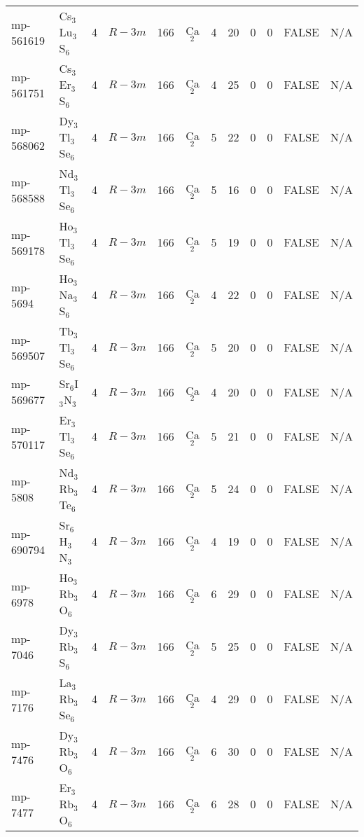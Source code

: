 {\begin{longtable}{llcccccccccc}
    mp-561619 & Cs$_{3}$Lu$_{3}$S$_{6}$ & 4     & $R-3m$ & 166   & Ca$_{2}$ & 4     & 20    & 0     & 0     & FALSE & N/A \\
    mp-561751 & Cs$_{3}$Er$_{3}$S$_{6}$ & 4     & $R-3m$ & 166   & Ca$_{2}$ & 4     & 25    & 0     & 0     & FALSE & N/A \\
    mp-568062 & Dy$_{3}$Tl$_{3}$Se$_{6}$ & 4     & $R-3m$ & 166   & Ca$_{2}$ & 5     & 22    & 0     & 0     & FALSE & N/A \\
    mp-568588 & Nd$_{3}$Tl$_{3}$Se$_{6}$ & 4     & $R-3m$ & 166   & Ca$_{2}$ & 5     & 16    & 0     & 0     & FALSE & N/A \\
    mp-569178 & Ho$_{3}$Tl$_{3}$Se$_{6}$ & 4     & $R-3m$ & 166   & Ca$_{2}$ & 5     & 19    & 0     & 0     & FALSE & N/A \\
    mp-5694 & Ho$_{3}$Na$_{3}$S$_{6}$ & 4     & $R-3m$ & 166   & Ca$_{2}$ & 4     & 22    & 0     & 0     & FALSE & N/A \\
    mp-569507 & Tb$_{3}$Tl$_{3}$Se$_{6}$ & 4     & $R-3m$ & 166   & Ca$_{2}$ & 5     & 20    & 0     & 0     & FALSE & N/A \\
    mp-569677 & Sr$_{6}$I$_{3}$N$_{3}$ & 4     & $R-3m$ & 166   & Ca$_{2}$ & 4     & 20    & 0     & 0     & FALSE & N/A \\
    mp-570117 & Er$_{3}$Tl$_{3}$Se$_{6}$ & 4     & $R-3m$ & 166   & Ca$_{2}$ & 5     & 21    & 0     & 0     & FALSE & N/A \\
    mp-5808 & Nd$_{3}$Rb$_{3}$Te$_{6}$ & 4     & $R-3m$ & 166   & Ca$_{2}$ & 5     & 24    & 0     & 0     & FALSE & N/A \\
    mp-690794 & Sr$_{6}$H$_{3}$N$_{3}$ & 4     & $R-3m$ & 166   & Ca$_{2}$ & 4     & 19    & 0     & 0     & FALSE & N/A \\
    mp-6978 & Ho$_{3}$Rb$_{3}$O$_{6}$ & 4     & $R-3m$ & 166   & Ca$_{2}$ & 6     & 29    & 0     & 0     & FALSE & N/A \\
    mp-7046 & Dy$_{3}$Rb$_{3}$S$_{6}$ & 4     & $R-3m$ & 166   & Ca$_{2}$ & 5     & 25    & 0     & 0     & FALSE & N/A \\
    mp-7176 & La$_{3}$Rb$_{3}$Se$_{6}$ & 4     & $R-3m$ & 166   & Ca$_{2}$ & 4     & 29    & 0     & 0     & FALSE & N/A \\
    mp-7476 & Dy$_{3}$Rb$_{3}$O$_{6}$ & 4     & $R-3m$ & 166   & Ca$_{2}$ & 6     & 30    & 0     & 0     & FALSE & N/A \\
    mp-7477 & Er$_{3}$Rb$_{3}$O$_{6}$ & 4     & $R-3m$ & 166   & Ca$_{2}$ & 6     & 28    & 0     & 0     & FALSE & N/A \\

\end{longtable}}
